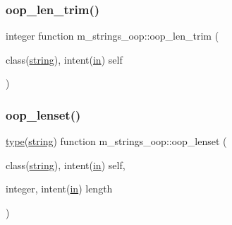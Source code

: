 \mbox{\label{namespacem__strings__oop_a1b9bf3c6aac71ce1782fb3116ffb63f8}} 
\subsubsection{\texorpdfstring{oop\+\_\+len\+\_\+trim()}{oop\_len\_trim()}}
{\footnotesize\ttfamily integer function m\+\_\+strings\+\_\+oop\+::oop\+\_\+len\+\_\+trim (\begin{DoxyParamCaption}\item[{class(\hyperlink{structm__strings__oop_1_1string}{string}), intent(\hyperlink{M__journal_83_8txt_afce72651d1eed785a2132bee863b2f38}{in})}]{self }\end{DoxyParamCaption})\hspace{0.3cm}{\ttfamily [private]}}

\mbox{\label{namespacem__strings__oop_ac8ca18186659b8759b08e5167a3effb5}} 
\subsubsection{\texorpdfstring{oop\+\_\+lenset()}{oop\_lenset()}}
{\footnotesize\ttfamily \hyperlink{stop__watch_83_8txt_a70f0ead91c32e25323c03265aa302c1c}{type}(\hyperlink{structm__strings__oop_1_1string}{string}) function m\+\_\+strings\+\_\+oop\+::oop\+\_\+lenset (\begin{DoxyParamCaption}\item[{class(\hyperlink{structm__strings__oop_1_1string}{string}), intent(\hyperlink{M__journal_83_8txt_afce72651d1eed785a2132bee863b2f38}{in})}]{self,  }\item[{integer, intent(\hyperlink{M__journal_83_8txt_afce72651d1eed785a2132bee863b2f38}{in})}]{length }\end{DoxyParamCaption})\hspace{0.3cm}{\ttfamily [private]}}

\mbox{\label{namespacem__strings__oop_ad49fed83544ede7b94948dee326ca3d7}} 
